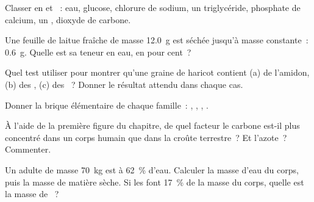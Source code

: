 \begin{exercise}[$\star$]\label{exo:g10:chemistry-of-life:2}
Classer en  et ~: eau, glucose,
chlorure de sodium, un triglycéride, phosphate de calcium, un , dioxyde de carbone.
\end{exercise}

\begin{exercise}[$\star$]\label{exo:g10:chemistry-of-life:3}
Une feuille de laitue fraîche de masse \qty{12.0}{g} est séchée jusqu'à
masse constante~: \qty{0.6}{g}. Quelle est sa teneur en eau, en pour
cent~?
\end{exercise}

\begin{exercise}[$\star$]\label{exo:g10:chemistry-of-life:4}
Quel test utiliser pour montrer qu'une graine de haricot contient
(a) de l'amidon, (b) des , (c) des ~? Donner le
résultat attendu dans chaque cas.
\end{exercise}

\begin{exercise}[$\star$]\label{exo:g10:chemistry-of-life:5}
Donner la brique élémentaire de chaque famille~: , ,
, .
\end{exercise}

\begin{exercise}[$\star\star$]\label{exo:g10:chemistry-of-life:6}
À l'aide de la première figure du chapitre, de quel facteur le carbone
est-il plus concentré dans un corps humain que dans la croûte
terrestre~? Et l'azote~? Commenter.
\end{exercise}

\begin{exercise}[$\star\star$]\label{exo:g10:chemistry-of-life:7}
Un adulte de masse \qty{70}{kg} est à 62~\% d'eau. Calculer la masse
d'eau du corps, puis la masse de matière sèche. Si les  font
17~\% de la masse du corps, quelle est la masse de ~?
\end{exercise}

